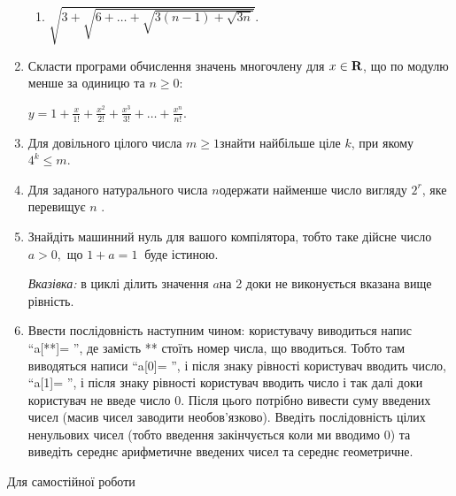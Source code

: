 \documentclass[]{article}
\makeatletter
\newcommand{\xslalph}[1]{\expandafter\@xslalph\csname c@#1\endcsname}
\newcommand{\@xslalph}[1]{%
    \ifcase#1\or а\or б\or в\or г\or д\or e\or є\or ж\or з\or i%
    \or й\or к\or л\or м\or н\or о\or п\or р\or с\or т%
    \or у\or ф\or х\or ц\or ч\or ш\or ю\or я\or аа\or бб\or вв%
    \else\@ctrerr\fi%
}
\makeatother
\begin{document}
\begin{enumerate}
\begin{enumerate}[label=\xslalph*)]
\item
 \(\sqrt{3 + \sqrt{6 + \ldots + \sqrt{3(n - 1) + \sqrt{3n}}}}.\)

\end{enumerate}

\item
  Скласти програми обчислення значень многочлену для 
  \(x \in \bf{R}\), що по модулю менше за одиницю та
  \( n \geq 0\):

\(y = 1 + \frac{x}{1!} + \frac{x^{2}}{2!} + \frac{x^{3}}{3!} + \ldots + \frac{x^{n}}{n!} \).

\item
  Для довільного цілого числа \(m \geq 1\)знайти найбільше ціле \(k\),
  при якому \(4^{k} \leq m\).
\item
  Для заданого натурального числа \(n\)одержати найменше число вигляду
  \(2^{r}\), яке перевищує \(n\) .
\item
  Знайдіть машинний нуль для вашого компілятора, тобто таке дійсне число
  \(a > 0,\) що \(1 + a = 1\ \) буде істиною.

\emph{Вказівка:} в циклі ділить значення \(a\)на 2 доки не виконується
вказана вище рівність.

\item
  Ввести послідовність наступним чином: користувачу виводиться напис
  ``a{[}**{]}= '', де замість ** стоїть номер числа, що вводиться. Тобто
  там виводяться написи ``a{[}0{]}= '', і після знаку рівності
  користувач вводить число, ``a{[}1{]}= '', і після знаку рівності
  користувач вводить число і так далі доки користувач не введе число 0.
  Після цього потрібно вивести суму введених чисел (масив чисел заводити
  необов'язково). Введіть послідовність цілих ненульових чисел (тобто введення
  закінчується коли ми вводимо 0) та виведіть середнє арифметичне
  введених чисел та середнє геометричне.

\end{enumerate}

Для самостійної роботи
\end{document}
